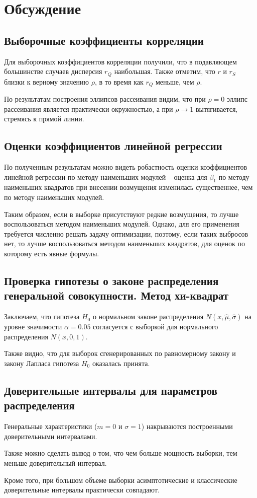 \documentclass[12pt]{article}
\begin{document}
	\section{Обсуждение}
	
	\subsection{Выборочные коэффициенты корреляции}
	
	Для выборочных коэффициентов корреляции получили, что в подавляющем большинстве случаев дисперсия $r_Q$ наибольшая. Также отметим, что $r$ и $r_S$ близки к верному значению $\rho$, в то время как $r_Q$ меньше, чем $\rho$.
	
	По результатам построения эллипсов рассеивания видим, что при $\rho = 0$ эллипс рассеивания является практически окружностью, а при $\rho \rightarrow 1$ вытягивается, стремясь к прямой линии.
	
	\subsection{Оценки коэффициентов линейной регрессии}
	
	По полученным результатам можно видеть робастность оценки коэффициентов линейной регрессии по методу наименьших модулей -- оценка для $\beta_1$ по методу наименьших квадратов при внесении возмущения изменилась существеннее, чем по методу наименьших модулей.
	
	Таким образом, если в выборке присутствуют редкие возмущения, то лучше воспользоваться методом наименьших модулей. Однако, для его применения требуется численно решать задачу оптимизации, поэтому, если таких выбросов нет, то лучше воспользоваться методом наименьших квадратов, для оценок по которому есть явные формулы.
	
	\subsection{Проверка гипотезы о законе распределения генеральной совокупности. Метод хи-квадрат}
	
	Заключаем, что гипотеза $H_0$ о нормальном законе распределения $N(x, \widehat{\mu}, \widehat{\sigma})$ на уровне значимости $\alpha = 0.05$ согласуется с выборкой для нормального распределения $N(x, 0, 1)$.
	
	Также видно, что для выборок сгенерированных по равномерному закону и закону Лапласа
	гипотеза $H_0$ оказалась принята.
	
	\subsection{Доверительные интервалы для параметров распределения}
	
	Генеральные характеристики ($m = 0$ и $\sigma = 1$) накрываются построенными доверительными интервалами.
	
	Также можно сделать вывод о том, что чем больше мощность выборки, тем меньше доверительный интервал.
	
	Кроме того, при большом объеме выборки асимптотические и классические доверительные интервалы практически совпадают.
	
\end{document}
